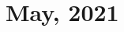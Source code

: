 \documentclass[a4paper, 12pt, notitlepage]{report}
\begin{document}
\chapter{May, 2021}
%
%
%
%
%
%
%
%
%
%
%
%
%
%
\end{document}
